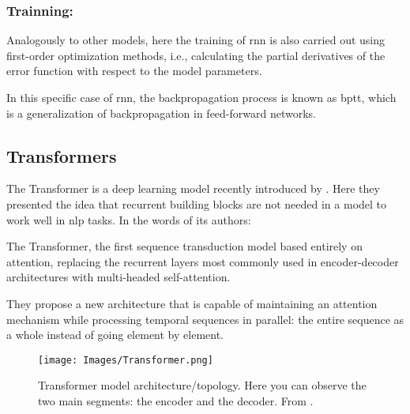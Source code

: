 \subsubsection{Trainning: }%

Analogously to other models, here the training of \gls{rnn} is also carried out
using first-order optimization methods, i.e., calculating the partial
derivatives of the error function with respect to the model parameters.

In this specific case of \gls{rnn}, the backpropagation process is known as
\gls{bptt}, which is a generalization of backpropagation in feed-forward
networks.


\subsection{Transformers}\label{sec:transformers}

The Transformer is a deep learning model recently introduced by
. Here they presented the idea that
recurrent building blocks are not needed in a model to work well in \gls{nlp}
tasks. In the words of its authors:

\begin{quoteBox}
  The Transformer, the first sequence transduction model based entirely
  on attention, replacing the recurrent layers most commonly used in
  encoder-decoder architectures with multi-headed self-attention.
  \tcblower{}
\end{quoteBox}

They propose a new architecture that is capable of maintaining an attention
mechanism while processing temporal sequences in parallel: the entire sequence
as a whole instead of going element by element.

\begin{figure}[p]
  \centering
  \texttt{[image: Images/Transformer.png]}
  \caption[Transformer model architecture]{Transformer model
    architecture/topology. Here you can observe the two main segments: the
    encoder and the decoder. From
    .}\label{fig:transformer}
\end{figure}

